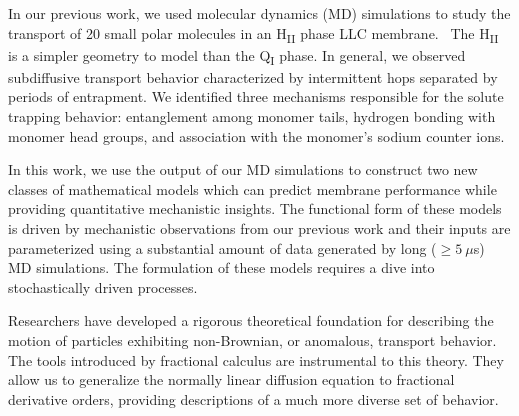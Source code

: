\documentclass{article}
\begin{document}
  In our previous work, we used molecular dynamics (MD) simulations to study the transport
  of 20 small polar molecules in an H\textsubscript{II} phase LLC membrane.~\cite{coscia_chemically_2019}
  The H\textsubscript{II} is a simpler geometry to model than the Q\textsubscript{I} phase.  
  In general, we observed subdiffusive transport behavior characterized by intermittent hops 
  separated by periods of entrapment. We identified three mechanisms responsible for the 
  solute trapping behavior: entanglement among monomer tails, hydrogen bonding with monomer
  head groups, and association with the monomer's sodium counter ions.
  
  In this work, we use the output of our MD simulations to construct two new classes of 
  mathematical models which can predict membrane performance while providing quantitative 
  mechanistic insights. The functional form of these models is driven by mechanistic 
  observations from our previous work and their inputs are parameterized using a 
  substantial amount of data generated by long ($\geq 5~\mu$s) MD simulations. The formulation
  of these models requires a dive into stochastically driven processes.
  
%  
  
  Researchers have developed a rigorous theoretical foundation for describing the 
  motion of particles exhibiting non-Brownian, or anomalous, transport behavior.
  The tools introduced by fractional calculus are instrumental to this theory. They
  allow us to generalize the normally linear diffusion equation to fractional
  derivative orders, providing descriptions of a much more diverse set of behavior.~\cite{klages_anomalous_2008}
\end{document}
